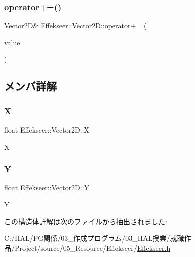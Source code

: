\subsubsection{\texorpdfstring{operator+=()}{operator+=()}}
{\footnotesize\ttfamily \mbox{\hyperlink{struct_effekseer_1_1_vector2_d}{Vector2D}}\& Effekseer\+::\+Vector2\+D\+::operator+= (\begin{DoxyParamCaption}\item[{const \mbox{\hyperlink{struct_effekseer_1_1_vector2_d}{Vector2D}} \&}]{value }\end{DoxyParamCaption})}



\subsection{メンバ詳解}
\mbox{\label{struct_effekseer_1_1_vector2_d_ae84928d10dd54136f362361aad8fe4aa}} 
\subsubsection{\texorpdfstring{X}{X}}
{\footnotesize\ttfamily float Effekseer\+::\+Vector2\+D\+::X}



X 

\mbox{\label{struct_effekseer_1_1_vector2_d_a648a6d6b86aaaeadc2302ae99d2d2768}} 
\subsubsection{\texorpdfstring{Y}{Y}}
{\footnotesize\ttfamily float Effekseer\+::\+Vector2\+D\+::Y}



Y 



この構造体詳解は次のファイルから抽出されました\+:\begin{DoxyCompactItemize}
\item 
C\+:/\+H\+A\+L/\+P\+G関係/03\+\_\+作成プログラム/03\+\_\+\+H\+A\+L授業/就職作品/\+Project/source/05\+\_\+\+Resource/\+Effekseer/\mbox{\hyperlink{_effekseer_8h}{Effekseer.\+h}}\end{DoxyCompactItemize}
